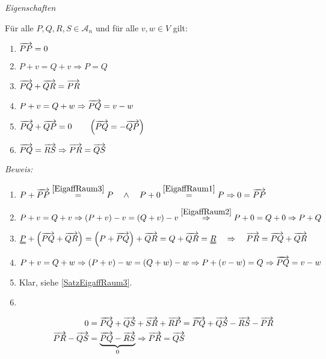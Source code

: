 \begin{mysatz} \textit{Eigenschaften}\medskip

    Für alle $P,Q,R,S \in \mathcal{A}_n$ und für alle $v,w \in V$ gilt:
    \begin{enumerate}
        \item $\overrightarrow{PP} = 0$
        \item $P + v = Q + v \Rightarrow P = Q$
        \item \label{SatzEigaffRaum3} $\overrightarrow{PQ} + \overrightarrow{QR} = \overrightarrow{PR}$
        \item $P + v = Q + w \Rightarrow \overrightarrow{PQ} = v - w$
        \item $\overrightarrow{PQ} + \overrightarrow{QP} = 0 \qquad \left( \overrightarrow{PQ} = - \overrightarrow{QP}  \right)$
        \item $\overrightarrow{PQ} = \overrightarrow{RS} \Rightarrow \overrightarrow{PR} = \overrightarrow{QS}$
    \end{enumerate}
    \textit{Beweis:}
    \begin{enumerate}
        \item $P + \overrightarrow{PP} \stackrel{\ref{EigaffRaum3}}= P \quad \wedge \quad P + 0 \stackrel{\ref{EigaffRaum1}}= P \Rightarrow 0 = \overrightarrow{PP}$
        \item $P + v = Q + v \Rightarrow (P + v) - v = (Q + v) - v \stackrel{\ref{EigaffRaum2}}\Rightarrow P + 0 = Q + 0 \Rightarrow P + Q$
        \item $\uuline{P} + \left( \ora{PQ} + \ora{QR} \right) = \left( P + \ora{PQ} \right) + \ora{QR} = Q + \ora{QR} = \uuline{R} \quad \Rightarrow \quad \ora{PR} = \ora{PQ} + \ora{QR}$
        \item $P + v = Q + w \Rightarrow \left( P + v \right) - w = \left( Q + w \right) - w \Rightarrow P + (v - w) = Q \Rightarrow \overrightarrow{PQ} = v - w$
        \item Klar, siehe \ref{SatzEigaffRaum3}.
        \item \ \\
            \begin{minipage}{0.6\textwidth}
                \begin{align*}
                    0 & = \overrightarrow{PQ} + \overrightarrow{QS} + \overrightarrow{SR} + \overrightarrow{RP} = \overrightarrow{PQ} + \overrightarrow{QS} - \overrightarrow{RS} - \overrightarrow{PR}\\
                    \overrightarrow{PR} - \overrightarrow{QS} & = \underbrace{\overrightarrow{PQ} - \overrightarrow{RS}}_{0} \Rightarrow \overrightarrow{PR} = \overrightarrow{QS}\\
                \end{align*}
            \end{minipage}
            \begin{minipage}{0.4\textwidth}

\end{minipage}
\end{enumerate}
\end{mysatz}
